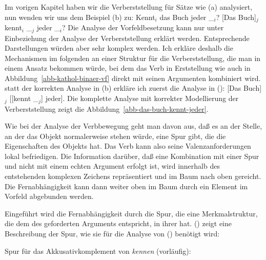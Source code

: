 Im vorigen Kapitel haben wir die Verberststellung für Sätze wie (a) analysiert, nun wenden wir uns
dem Beispiel (b) zu:
\eal
\ex Kennt$_i$ das Buch jeder \_$_i$?
\ex {}[Das Buch]$_j$ kennt$_i$ \_$_j$ jeder \_$_i$?
\zl
Die Analyse der Vorfeldbesetzung kann nur unter Einbeziehung der Analyse der Verberststellung erklärt
werden. Entsprechende Darstellungen würden aber sehr komplex werden. Ich erkläre deshalb
die Mechanismen im folgenden an einer Struktur für die Verberststellung, die man in einem
Ansatz %
bekommen würde, bei dem das Verb in Erststellung wie auch in Abbildung~\ref{abb-kathol-binaer-vf}
direkt mit seinen Argumenten kombiniert wird. \Dh statt der korrekten Analyse in (b) erkläre
ich zuerst die Analyse in ():
\ea
{}[Das Buch]$_j$ [[kennt \_$_j$] jeder].\label{ex-das-buch-kennt}
\z 
Die komplette Analyse mit korrekter Modellierung der Verberststellung zeigt
die Abbildung~\vref{abb-das-buch-kennt-jeder}.


Wie bei der Analyse der Verbbewegung geht man davon aus, daß es an der Stelle, an der
das Objekt normalerweise stehen würde, eine Spur gibt, die die Eigenschaften des Objekts
hat. Das Verb kann also seine Valenzanforderungen lokal befriedigen. Die Information darüber,
daß eine Kombination mit einer Spur und nicht mit einem echten Argument erfolgt ist,
wird innerhalb des entstehenden komplexen Zeichens repräsentiert und im Baum nach oben gereicht.
Die Fernabhängigkeit kann dann weiter oben im Baum durch ein Element im Vorfeld abgebunden werden.

Eingeführt wird die Fernabhängigkeit durch die Spur, die eine
Merkmalstruktur, die dem \localw des geforderten Arguments entspricht, in ihrer
\slashl hat. () zeigt eine Beschreibung der Spur, wie sie für die Analyse von () benötigt wird:

\eas
\label{le-spur-acc-o-kennen}
Spur für das Akkusativkomplement von {\em kennen\/} (vorläufig):\\
\zs

